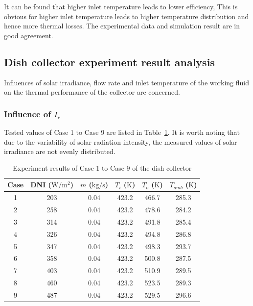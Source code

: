 It can be found that higher inlet temperature leads to lower efficiency, This is obvious for higher inlet temperature leads to higher temperature distribution and hence more thermal losses. The experimental data and simulation result are in good agreement.

\subsection{Dish collector experiment result analysis}
Influences of solar irradiance, flow rate and inlet temperature of the working fluid on the thermal performance of the collector are concerned.
\subsubsection{Influence of $I_r$}
Tested values of Case 1 to Case 9 are listed in Table~\ref{tab:ResultOfDish1}. It is worth noting that due to the variability of solar radiation intensity, the measured values of solar irradiance are not evenly distributed.

\begin{table}[htbp]\footnotesize
	\caption{Experiment results of Case 1 to Case 9 of the dish collector}
	\begin{center}
	\begin{tabular}{cccccc}
		\toprule
		Case	& DNI ($\mathrm{W/m^2}$)	&	$\dot{m}$ ($\mathrm{kg/s}$)			&	$T_i$ ($\mathrm{K}$)	&	$T_o$ ($\mathrm{K}$)		&	$T_{amb}$ ($\mathrm{K}$)\\
		\midrule
		1	&	203	&	0.04	&	423.2	&	466.7	&	285.3\\
		2	&	258	&	0.04	&	423.2	&	478.6	&	284.2\\
		3	&	314	&	0.04	&	423.2	&	491.8	&	285.4	\\
		4	&	326	&	0.04	&	423.2	&	494.8	&	286.8\\
		5	&	347	&	0.04	&	423.2	&	498.3	&	293.7\\
		6	&	358	&	0.04	&	423.2	&	500.8	&	287.5\\
		7	&	403	&	0.04	&	423.2	&	510.9	&	289.5\\
		8	&	460	&	0.04	&	423.2	&	523.5	&	289.3\\
		9	&	487	&	0.04	&	423.2	&	529.5	&	296.6\\
		\bottomrule
	\end{tabular}
	\end{center}
	\label{tab:ResultOfDish1}
\end{table}

